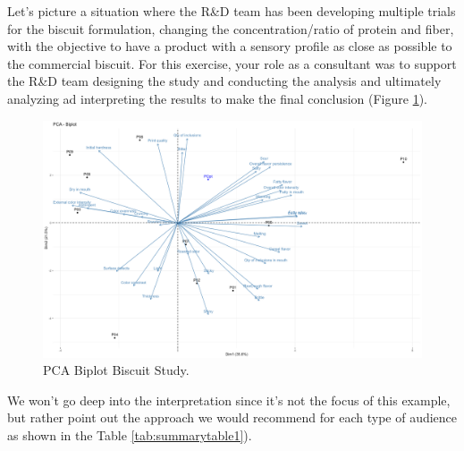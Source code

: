 \documentclass[
]{krantz}
\begin{document}
Let's picture a situation where the R\&D team has been developing multiple trials for the biscuit formulation, changing the concentration/ratio of protein and fiber, with the objective to have a product with a sensory profile as close as possible to the commercial biscuit. For this exercise, your role as a consultant was to support the R\&D team designing the study and conducting the analysis and ultimately analyzing ad interpreting the results to make the final conclusion (Figure \ref{fig:pca}).

\begin{figure}

{\centering \includegraphics[width=0.9\linewidth]{images/PCA} 

}

\caption{PCA Biplot Biscuit Study.}\label{fig:pca}
\end{figure}

We won't go deep into the interpretation since it's not the focus of this example, but rather point out the approach we would recommend for each type of audience as shown in the Table \ref{tab:summarytable1}).

\providecommand{\docline}[3]{\noalign{\global\setlength{\arrayrulewidth}{#1}}\arrayrulecolor[HTML]{#2}\cline{#3}}

\setlength{\tabcolsep}{0pt}

\renewcommand*{\arraystretch}{1.5}
\end{document}
